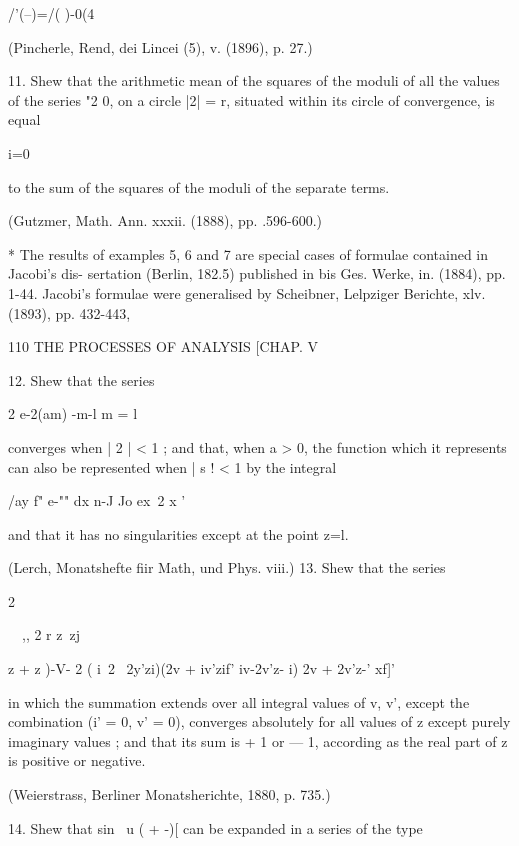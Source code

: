 {{{{/'(--)=/( )-0(4 

(Pincherle, Rend, dei Lincei (5), v. (1896), p. 27.) 

11. Shew that the arithmetic mean of the squares of the moduli of all the values of 
the series "2 0,  on a circle |2| = r, situated within its circle of convergence, is equal 

 i=0 

to the sum of the squares of the moduli of the separate terms. 

(Gutzmer, Math. Ann. xxxii. (1888), pp. .596-600.) 

* The results of examples 5, 6 and 7 are special cases of formulae contained in Jacobi's dis- 
sertation (Berlin, 182.5) published in bis Ges. Werke, in. (1884), pp. 1-44. Jacobi's formulae 
were generalised by Scheibner, Lelpziger Berichte, xlv. (1893), pp. 432-443, 



110 THE PROCESSES OF ANALYSIS [CHAP. V 

12. Shew that the series 

2 e-2(am) -m-l 
m = l 

converges when | 2 | < 1 ; and that, when a > 0, the function which it represents can also 
be represented when | s ! < 1 by the integral 



/ay f" e-"" dx 
 n-J Jo ex\ 2 x  ' 



and that it has no singularities except at the point z=l. 

(Lerch, Monatshefte fiir Math, und Phys. viii.) 
13. Shew that the series 



2 



\ \ ,, 2 r z\  zj  \ 

 z + z )-V- 2  ( i\ 2 \ 2y'zi)(2v + iv'zif'   iv-2v'z- i) 2v + 2v'z-' xf]' 



in which the summation extends over all integral values of v, v', except the combination 
(i' = 0, v' = 0), converges absolutely for all values of z except purely imaginary values ; and 
that its sum is + 1 or — 1, according as the real part of z is positive or negative. 

(Weierstrass, Berliner Monatsherichte, 1880, p. 735.) 

14. Shew that sin \ u (  + -)[ can be expanded in a series of the type 

}}}}
